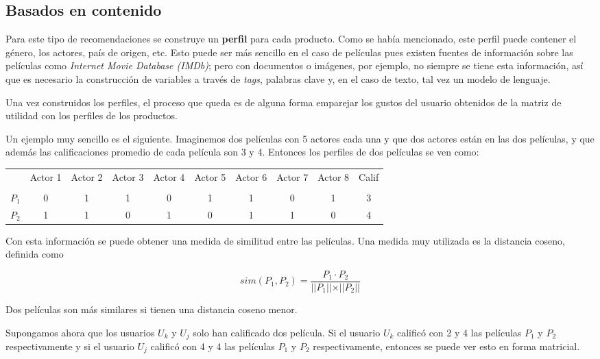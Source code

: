 \subsection{Basados en contenido}

Para este tipo de recomendaciones se construye un \textbf{perfil} para cada producto. Como se había mencionado, este perfil puede contener el género, los actores, país de origen, etc. Esto puede ser más sencillo en el caso de películas pues existen fuentes de información sobre las películas como \textit{Internet Movie Database (IMDb)}; pero con documentos o imágenes, por ejemplo, no siempre se tiene esta información, así que es necesario la construcción de variables a través de \textit{tags}, palabras clave y, en el caso de texto, tal vez un modelo de lenguaje.

Una vez construidos los perfiles, el proceso que queda es de alguna forma emparejar los gustos del usuario obtenidos de la matriz de utilidad con los perfiles de los productos.

Un ejemplo muy sencillo es el siguiente. Imaginemos dos películas con 5 actores cada una y que dos actores están en las dos películas, y que además las calificaciones promedio de cada película son 3 y 4. Entonces los perfiles de dos películas se ven como:

\begin{center}
\begin{tabular}{ c | c  c c c c c c c c}
    & Actor 1 & Actor 2 & Actor 3 & Actor 4 & Actor 5 & Actor 6 & Actor 7 & Actor 8 & Calif \\ \\
  \hline                       
$P_1$ & 0 & 1 & 1 & 0 & 1 & 1 & 0 & 1 & 3 \\
$P_2$ & 1 & 1 & 0 & 1 & 0 & 1 & 1 & 0 & 4 \\
  \hline  
\end{tabular}
\end{center}

Con esta información se puede obtener una medida de similitud entre las películas. Una medida muy utilizada es la distancia coseno, definida como

\begin{equation}
sim(P_1, P_2) = \dfrac{P_1 \cdot P_2}{\vert \vert P_1 \vert \vert \times \vert \vert P_2 \vert \vert}
\end{equation}

Dos películas son más similares si tienen una distancia coseno menor.

Supongamos ahora que los usuarios $U_k$ y $U_j$ solo han calificado dos película. Si el usuario $U_k$ calificó con 2 y 4 las películas $P_1$ y $P_2$ respectivamente y si el usuario $U_j$ calificó con 4 y 4 las películas $P_1$ y $P_2$ respectivamente, entonces se puede ver esto en forma matricial.


